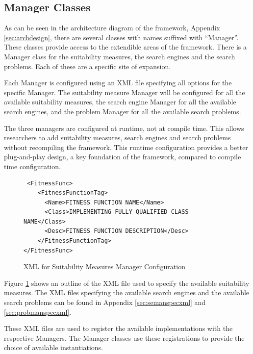 \subsection{Manager Classes}
\label{sec:manclasses}
As can be seen in the architecture diagram of the framework, Appendix \ref{sec:archdesign}, there are several classes with names suffixed with ``Manager''.
These classes provide access to the extendible areas of the framework.
There is a Manager class for the suitability measures, the search engines and the search problems.
Each of these are a specific site of expansion.

Each Manager is configured using an XML file specifying all options for the specific Manager.
The suitability measure Manager will be configured for all the available suitability measures, the search engine Manager for all the available search engines, and the problem Manager for all the available search problems.

The three managers are configured at runtime, not at compile time.
This allows researchers to add suitability measures, search engines and search problems without recompiling the framework.
This runtime configuration provides a better plug-and-play design, a key foundation of the framework, compared to compile time configuration.

\lstset{language=XML}
\begin{figure}
\begin{lstlisting}
 <FitnessFunc>
	<FitnessFunctionTag>
	  <Name>FITNESS FUNCTION NAME</Name>
	  <Class>IMPLEMENTING FULLY QUALIFIED CLASS NAME</Class>
	  <Desc>FITNESS FUNCTION DESCRIPTION</Desc>
	</FitnessFunctionTag>
</FitnessFunc>
\end{lstlisting}
\caption{XML for Suitability Measures Manager Configuration}
\label{code:fitfuntmanconfig}
\end{figure}

Figure \ref{code:fitfuntmanconfig} shows an outline of the XML file used to specify the available suitability measures.
The XML files specifying the available search engines and the available search problems can be found in Appendix \ref{sec:semanspecxml} and \ref{sec:probmanspecxml}.

These XML files are used to register the available implementations with the respective Managers.
The Manager classes use these registrations to provide the choice of available instantiations.


